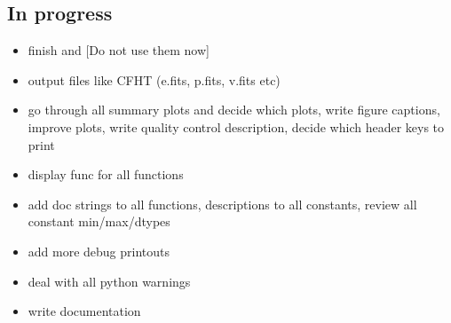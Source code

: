 \documentclass[a4paper,10pt,english]{report}
\begin{document}
\subsection{In progress}
\label{\detokenize{user/general/todo:in-progress}}\begin{itemize}
\item {} 
finish  and  {[}Do not use them now{]}

\item {} 
output files like CFHT (e.fits, p.fits, v.fits etc)

\item {} 
go through all summary plots and decide which plots, write figure captions,
improve plots, write quality control description, decide which header keys to print

\item {} 
display func for all functions

\item {} 
add doc strings to all functions, descriptions to all constants, review all
constant min/max/dtypes

\item {} 
add more debug printouts

\item {} 
deal with all python warnings

\item {} 
write documentation

\end{itemize}
\end{document}
